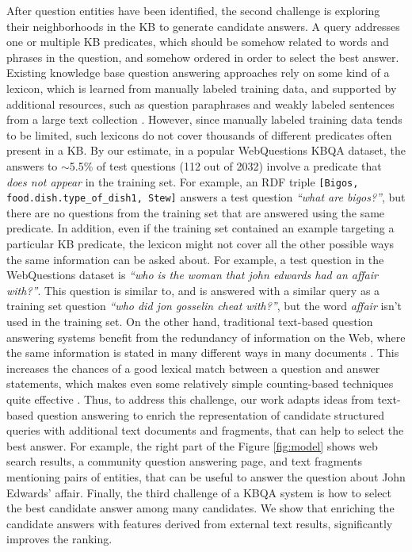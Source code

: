 After question entities have been identified, the second challenge is exploring their neighborhoods in the KB to generate candidate answers.
A query addresses one or multiple KB predicates, which should be somehow related to words and phrases in the question, and somehow ordered in order to select the best answer.
Existing knowledge base question answering approaches \cite{ACCU:2015,Berant:EMNLP13,berant2014semantic,berant2015imitation,BordesCW14:emnlp,yao2014freebase} rely on some kind of a lexicon, which is learned from manually labeled training data, and supported by  additional resources, such as question paraphrases \cite{berant2014semantic} and weakly labeled sentences from a large text collection \cite{yao2014information}.
However, since manually labeled training data tends to be limited, such lexicons do not cover thousands of different predicates often present in a KB.
By our estimate, in a popular WebQuestions KBQA dataset, the answers to $\sim$5.5\% of test questions (112 out of 2032) involve a predicate that {\em does not appear} in the training set.
For example, an RDF triple \texttt{[Bigos, food.dish.type\_of\_dish1, Stew]} answers a test question \textit{``what are bigos?''}, but there are no questions from the training set that are answered using the same predicate.
In addition, even if the training set contained an example targeting a particular KB predicate, the lexicon might not cover all the other possible ways the same information can be asked about.
For example, a test question in the WebQuestions dataset is \textit{``who is the woman that john edwards had an affair with?''}. This question is similar to, and is answered with a similar query as a training set question \textit{``who did jon gosselin cheat with?''}, but the word \textit{affair} isn't used in the training set.
On the other hand, traditional text-based question answering systems benefit from the redundancy of information on the Web, where the same information is stated in many different ways in many documents \cite{Lin:2007:EPU:1229179.1229180}.
This increases the chances of a good lexical match between a question and answer statements, which makes even some relatively simple counting-based techniques quite effective \cite{brill2002analysis}.
Thus, to address this challenge, our work adapts ideas from text-based question answering to enrich the representation of candidate structured queries with additional text documents and fragments, that can help to select the best answer.
For example, the right part of the Figure \ref{fig:model} shows web search results, a community question answering page, and text fragments mentioning pairs of entities, that can be useful to answer the question about John Edwards' affair.
Finally, the third challenge of a KBQA system is how to select the best candidate answer among many candidates. We show that enriching the candidate answers with features derived from external text results, significantly improves the ranking. 

